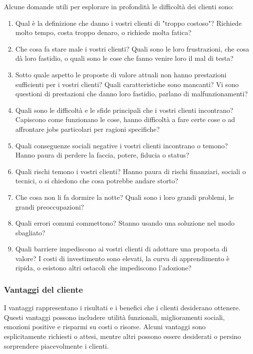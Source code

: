 Alcune domande utili per esplorare in profondità le difficoltà dei clienti sono:
\begin{enumerate}
    \item Qual è la definizione che danno i vostri clienti di "troppo costoso"? Richiede molto tempo, costa
troppo denaro, o richiede molta fatica?
    \item Che cosa fa stare male i vostri clienti? Quali sono le loro frustrazioni, che cosa dà loro fastidio, o quali sono le cose che fanno venire loro il mal di testa?
    \item Sotto quale aspetto le proposte di valore attuali non hanno prestazioni sufficienti per i vostri clienti? Quali caratteristiche sono mancanti? Vi sono questioni di prestazioni che danno loro fastidio, parlano di malfunzionamenti?
    \item Quali sono le difficoltà e le sfide principali che i vostri clienti incontrano? Capiscono come funzionano le cose, hanno difficoltà a fare certe cose o ad affrontare jobs particolari per ragioni specifiche?
    \item Quali conseguenze sociali negative i vostri clienti incontrano o temono? Hanno paura di perdere la faccia, potere, fiducia o status?
    \item Quali rischi temono i vostri clienti? Hanno paura di rischi finanziari, sociali o tecnici, o si chiedono che cosa potrebbe andare storto?
    \item Che cosa non li fa dormire la notte? Quali sono i loro grandi problemi, le grandi preoccupazioni?
    \item Quali errori comuni commettono? Stanno usando una soluzione nel modo sbagliato?
    \item Quali barriere impediscono ai vostri clienti di adottare una proposta di valore? I costi di investimento sono elevati, la curva di apprendimento è ripida, o esistono altri ostacoli che impediscono l'adozione?
\end{enumerate}

\subsubsection{Vantaggi del cliente}
I vantaggi rappresentano i risultati e i benefici che i clienti desiderano ottenere. Questi vantaggi possono includere utilità funzionali, miglioramenti sociali, emozioni positive e risparmi su costi o risorse. Alcuni vantaggi sono esplicitamente richiesti o attesi, mentre altri possono essere desiderati o persino sorprendere piacevolmente i clienti.

